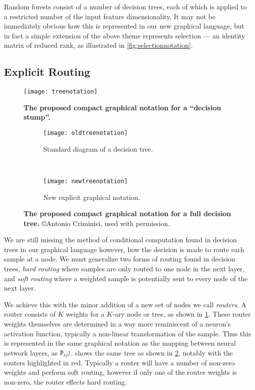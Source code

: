 \documentclass[thesis]{subfiles}
\begin{document}
	Random forests consist of a number of decision trees, each of which is applied to a restricted number of the input feature dimensionality. It may not be immediately obvious how this is represented in our new graphical language, but in fact a simple extension of the above theme represents selection --- \ie an identity matrix of reduced rank, as illustrated in \cref{fig:selectionnotation}.
	
	\subsection{Explicit Routing}
	\begin{figure}[tbp] 
		\centering
		\texttt{[image: treenotation]}
		\caption[Proposed graphical notation for a decision stump]{\textbf{The proposed compact graphical notation for a ``decision stump''.}}\label{fig:treeNotation}
	\end{figure}
	
	\begin{figure}[tbp] 
		\centering
		\begin{subfigure}[b]{0.4\textwidth}
			\centering
			\texttt{[image: oldtreenotation]}
			\caption{Standard diagram of a decision tree.}\label{fig:oldtreenotation}
		\end{subfigure}
		~
		\begin{subfigure}[b]{0.4\textwidth}
			\centering
			\texttt{[image: newtreenotation]}
			\caption{New explicit graphical notation.}\label{fig:newtreenotation}
		\end{subfigure}
		\caption[Proposed compact graphical notation for a decision tree]{\textbf{The proposed compact graphical notation for a full decision tree.} \copyright Antonio Criminisi, used with permission.}\label{fig:complexDecisionTree}
	\end{figure}
	
	We are still missing the method of conditional computation found in decision trees in our graphical language however, \ie how the decision is made to route each sample at a node. We must generalize two forms of routing found in decision trees, \emph{hard routing} where samples are only routed to one node in the next layer, and \emph{soft routing} where a weighted sample is potentially sent to every node of the next layer.
	
	We achieve this with the minor addition of a new set of nodes we call \emph{routers}. A router consists of $K$ weights for a $K$-ary node or tree, as shown in \cref{fig:treeNotation}. These router weights themselves are determined in a way more reminiscent of a neuron's activation function, typically a non-linear transformation of the sample. Thus this is represented in the same graphical notation as the mapping between neural network layers, \ie as $\mat P_{ij} \wr$.  shows the same tree as shown in \cref{fig:oldtreenotation}, notably with the routers highlighted in red. Typically a router will have a number of non-zero weights and perform soft routing, however if only one of the router weights is non-zero, the router effects hard routing.
	
\end{document}
